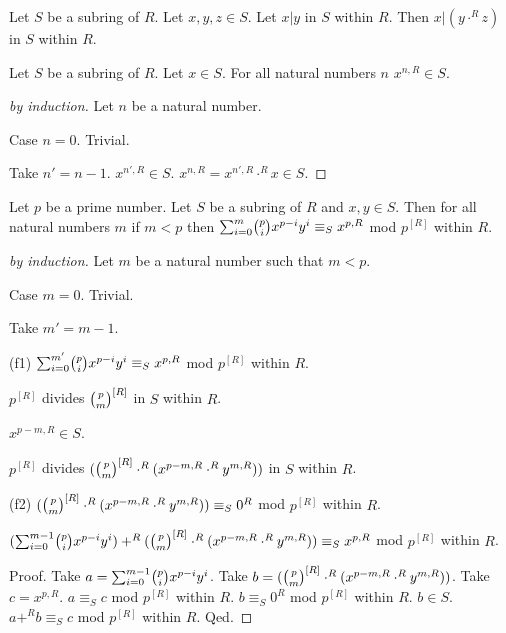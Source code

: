 \documentclass[11pt]{article}
\begin{document}
\begin{forthel}

\begin{lemma} Let $S$ be a subring of $R$.
Let $x,y,z \in S$. Let $x | y$ in $S$ within $R$.
Then $x | (y \cdot^{R} z)$ in $S$ within $R$.
\end{lemma}

\begin{lemma} Let $S$ be a subring of $R$.
Let $x \in S$. For all natural numbers $n$
$x^{n,R} \in S$.
\end{lemma}
\begin{proof}[by induction]
Let $n$ be a natural number.

Case $n=0$. Trivial.

Take $n'=n-1$.
$x^{n',R} \in S$.
$x^{n,R} = x^{n',R} \cdot^{R} x \in S$.
\end{proof}


\begin{lemma} Let $p$ be a prime number.
Let $S$ be a subring of $R$ and $x,y \in S$. 
Then for all natural numbers $m$ if $m < p$ then
$\binsum{m}{p}{x}{y}{R} \equiv_{S} x^{p,R}$ mod $p^{[R]}$ within $R$.
\end{lemma}

\begin{proof}[by induction]
Let $m$ be a natural number such that $m < p$.

Case $m = 0$. Trivial.

Take $m' = m - 1$.

(f1) $\binsum{m'}{p}{x}{y}{R} \equiv_{S} x^{p,R}$ mod $p^{[R]}$ within $R$.


$p^{[R]}$ divides $\cho{p}{m}^{[R]}$ in $S$ within
$R$.

$x^{p - m,R} \in S$.

$p^{[R]}$ divides $(\cho{p}{m}^{[R]} \cdot^{R} (x^{p - m,R} \cdot^{R} y^{m,R}))$ in $S$ within
$R$.

(f2) $(\cho{p}{m}^{[R]} \cdot^{R} (x^{p - m,R} \cdot^{R} y^{m,R})) \equiv_{S} 0^{R}$ mod $p^{[R]}$ within $R$.




$(\binsum{m-1}{p}{x}{y}{R}) +^{R} (\cho{p}{m}^{[R]} \cdot^{R} (x^{p - m,R} \cdot^{R} y^{m,R}))  
\equiv_{S} x^{p,R}$ mod $p^{[R]}$ within $R$.

Proof.
Take $a = \binsum{m-1}{p}{x}{y}{R}$. 
Take $b = (\cho{p}{m}^{[R]} \cdot^{R} (x^{p - m,R} \cdot^{R} y^{m,R}))$.
Take $c = x^{p,R}$.
$a \equiv_{S} c$ mod $p^{[R]}$ within $R$.
$b \equiv_{S} 0^{R}$ mod $p^{[R]}$ within $R$.
$b \in S$.
$a +^{R} b \equiv_{S} c $ mod $p^{[R]}$ within $R$.
Qed.


\end{proof}
\end{forthel}
\end{document}
